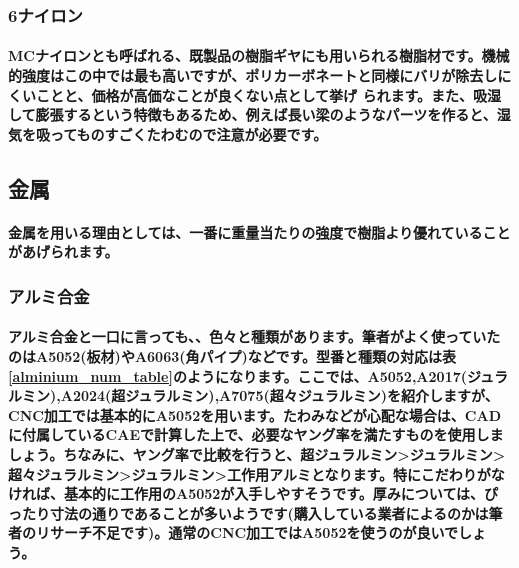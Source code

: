 \documentclass[b5paper, 9pt, twocolumn, titlepage,openany]{jsbook}%
\begin{document}
\subsubsection{6ナイロン}

\paragraph{MCナイロンとも呼ばれる、既製品の樹脂ギヤにも用いられる樹脂材です。機械的強度はこの中では最も高いですが、ポリカーボネートと同様にバリが除去しにくいことと、価格が高価なことが良くない点として挙げ られます。また、吸湿して膨張するという特徴もあるため、例えば長い梁のようなパーツを作ると、湿気を吸ってものすごくたわむので注意が必要です。}



\subsection{金属}

\paragraph{金属を用いる理由としては、一番に重量当たりの強度で樹脂より優れていることがあげられます。}

\subsubsection{アルミ合金}

\paragraph{アルミ合金と一口に言っても、、色々と種類があります。筆者がよく使っていたのはA5052(板材)やA6063(角パイプ)などです。型番と種類の対応は表\ref{alminium_num_table}のようになります。ここでは、A5052,A2017(ジュラルミン),A2024(超ジュラルミン),A7075(超々ジュラルミン)を紹介しますが、CNC加工では基本的にA5052を用います。たわみなどが心配な場合は、CADに付属しているCAEで計算した上で、必要なヤング率を満たすものを使用しましょう。ちなみに、ヤング率で比較を行うと、超ジュラルミン>ジュラルミン>超々ジュラルミン>ジュラルミン>工作用アルミとなります。特にこだわりがなければ、基本的に工作用のA5052が入手しやすそうです。厚みについては、ぴったり寸法の通りであることが多いようです(購入している業者によるのかは筆者のリサーチ不足です)。通常のCNC加工ではA5052を使うのが良いでしょう。}
\end{document}
